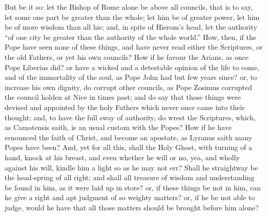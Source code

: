 But
be it so: let the Bishop of Rome alone be above all councils, that is
to say, let some one part be greater than the whole; let him be of greater
power, let him be of more wisdom than all his; and, in spite of Hierom’s
head, let the authority “of one city be greater than the authority
of the whole world.” How, then, if the Pope have seen none
of these things, and have never read either the Scriptures, or the old
Fathers, or yet his own councils? How if he favour the Arians,
as once Pope Liberius did? or have a wicked and a detestable opinion
of the life to come, and of the immortality of the soul, as Pope John
had but few years since? or, to increase his own dignity, do corrupt
other councils, as Pope Zosimus corrupted the council holden at Nice
in times past; and do say that those things were devised and appointed
by the holy Fathers which never once came into their thought; and, to
have the full sway of authority, do wrest the Scriptures, which, as
Camotensis saith, is an usual custom with the Popes? How if he
have renounced the faith of Christ, and become an apostate, as Lyranus
saith many Popes have been? And, yet for all this, shall the Holy
Ghost, with turning of a hand, knock at his breast, and even whether
he will or no, yea, and wholly against his
will, kindle him a light so as he may not err? Shall he straightway
be the head-spring of all right; and shall all treasure of wisdom and
understanding be found in him, as it were laid up in store? or, if these
things be not in him, can he give a right and apt judgment of so weighty
matters? or, if he be not able to judge, would he have that all those
matters should be brought before him alone?

